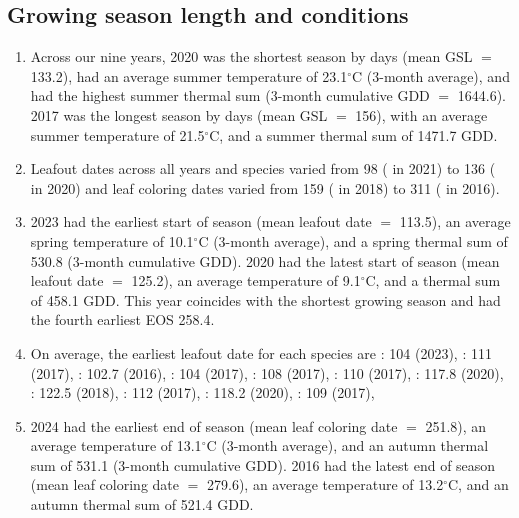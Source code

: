 \documentclass{article}\usepackage[]{graphicx}\usepackage[]{xcolor}
\begin{document}
\subsection{Growing season length and conditions}
\begin{enumerate}

\item Across our nine years, 
2020 was the shortest season by days (mean GSL $=$
133.2), had an average summer temperature of 
23.1$^\circ$C (3-month average), and had the highest summer thermal sum 
(3-month cumulative GDD $=$ 1644.6). 
2017 was the longest season by days (mean GSL $=$
156), with an average summer temperature of 
21.5$^\circ$C, and a summer thermal sum of 
1471.7 GDD.

\item Leafout dates across all years and species varied from 
98 ({\Afla} in 2021) to 
136 ({\Cova} in 2020) and leaf coloring dates varied from 
159 ({\Afla} in 2018) to 
311 ({\Tame} in 2016).

\item 2023 had the earliest start of season (mean leafout date $=$
113.5), an average spring temperature of 
10.1$^\circ$C (3-month average), 
and a spring thermal sum of 
530.8 (3-month cumulative GDD). 
2020 had the latest start of season (mean leafout date $=$
125.2), 
an average temperature of 
9.1$^\circ$C, and a thermal sum of 
458.1 GDD. This year coincides with the shortest growing season and had the fourth earliest EOS 258.4.

\item On average, the earliest leafout date for each species are
\Arub: 104 
(2023), 
\Asac: 111 
(2017), 
\Afla: 102.7 
(2016), 
\Ball: 104 
(2017), 
\Bnig: 108 
(2017), 
\Cgla: 110 
(2017), 
\Cova: 117.8 
(2020), 
\Pdel: 122.5 
(2018), 
\Qalb: 112 
(2017), 
\Qrub: 118.2 
(2020), 
\Tame: 109 
(2017), 

\item 2024 had the earliest end of season (mean leaf coloring date $=$
251.8), an average temperature of
13.1$^\circ$C (3-month average), and an autumn thermal sum of 
531.1 (3-month cumulative GDD). 
2016 had the latest end of season (mean leaf coloring date $=$
279.6), 
an average temperature of 
13.2$^\circ$C, and an autumn thermal sum of 
521.4 GDD. 


\end{enumerate}
\end{document}
